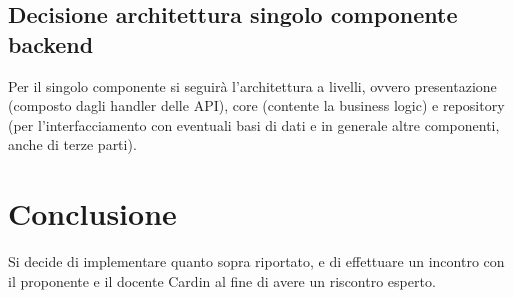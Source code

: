 \subsection{Decisione architettura singolo componente backend}
Per il singolo componente si seguirà l'architettura a livelli, ovvero presentazione (composto dagli handler delle API), core (contente la business logic) e repository
(per l'interfacciamento con eventuali basi di dati e in generale altre componenti, anche di terze parti).

\section{Conclusione}
Si decide di implementare quanto sopra riportato, e di effettuare un incontro con il proponente e il docente Cardin al fine di avere un riscontro esperto.